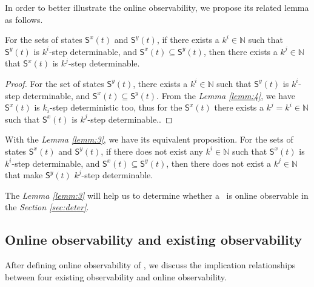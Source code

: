 In order to better illustrate the online observability, we propose its related lemma as follows.
\begin{lemma}
For the sets of states $\mathsf{S}^{x}(t)$ and $\mathsf{S}^{y}(t)$, if there exists a $k^{i}\in \mathbb{N}$ such that $\mathsf{S}^{y}(t)$ is $k^{i}$-step determinable, and $\mathsf{S}^{x}(t)\subseteq \mathsf{S}^{y}(t)$, then there exists a $k^{j}\in \mathbb{N}$ that $\mathsf{S}^{x}(t)$ is $k^{j}$-step determinable.
\label{lemm:3}
\end{lemma}
\begin{proof}For the set of states $\mathsf{S}^{y}(t)$, there exists a $k^{i}\in \mathbb{N}$ such that $\mathsf{S}^{y}(t)$ is $k^{i}$-step determinable, and $\mathsf{S}^{x}(t)\subseteq \mathsf{S}^{y}(t)$. From the {\em Lemma \ref{lemm:4}}, we have $\mathsf{S}^{x}(t)$ is $k_i$-step deterministic too, thus for the $\mathsf{S}^{x}(t)$ there exists a $k^{j}=k^{i}\in \mathbb{N}$ such that $\mathsf{S}^{x}(t)$ is $k^{j}$-step determinable..
\end{proof}

With the {\em Lemma \ref{lemm:3}}, we have its equivalent proposition.
For the sets of states $\mathsf{S}^{x}(t)$ and $\mathsf{S}^{y}(t)$, if there does not exist any $k^{i}\in \mathbb{N}$ such that $\mathsf{S}^{x}(t)$ is $k^{i}$-step determinable, and $\mathsf{S}^{x}(t)\subseteq \mathsf{S}^{y}(t)$, then there does not exist a $k^{j}\in \mathbb{N}$ that make $\mathsf{S}^{y}(t)$ $k^{j}$-step determinable.


The {\em Lemma \ref{lemm:3}} will help us to determine whether a \BCN\ is online observable in the {\em Section \ref{sec:deter}}.
\subsection{Online observability and existing observability}
After defining online observability of \BCNs, we discuss the implication relationships between four existing observability and online observability. %

